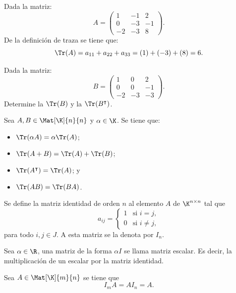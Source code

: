 \documentclass[compacto,10pt]{pubciencias-notas}
\begin{document}
\begin{ejem}
Dada la matriz:
\[
A= 
\begin{pmatrix}
1&-1&2\\
0&-3&-1\\
-2&-3&8
\end{pmatrix}.
\]
De la definición de traza se tiene que:
\[
    \Tr(A) = a_{11} + a_{22} + a_{33} = (1)+(-3)+(8)=6.
\]
\end{ejem}

\begin{ejer}
Dada la matriz:
\[
B= 
\begin{pmatrix}
1&0&2\\
0&0&-1\\
-2&-3&-3
\end{pmatrix}.
\]
Determine la $\Tr(B)$ y la $\Tr(B^{\intercal})$.
\end{ejer}

\begin{teo}\label{Teo:PropTraza}
    Sea $A, B \in \Mat[\K]{n}{n}$ y $\alpha \in \K$. Se tiene que:
    \begin{itemize}
        \item $\Tr(\alpha A) = \alpha \Tr(A)$;
        \item $\Tr(A + B) = \Tr(A) + \Tr(B)$;
        \item $\Tr(A^{\intercal}) = \Tr(A)$; y
        \item $\Tr(A B) = \Tr(B A)$.
    \end{itemize}
\end{teo}


\begin{defi}
    Se define la matriz identidad de orden $n$ al elemento $A$ de $\K^{n \times n}$ tal que
    \[
        a_{ij} =
            \begin{cases}
            1 & \text{si } i=j, \\
            0 & \text{si } i \neq j,
            \end{cases}
    \]
    para todo $i,j\in J$. A esta matriz se la denota por $I_n$.
\end{defi}

\begin{obs}
    Sea $\alpha\in\R$, una matriz de la forma $\alpha I$ se llama matriz escalar. Es decir, la multiplicación de un escalar por la matriz identidad. 
\end{obs}

\begin{prop}
    Sea $A\in\Mat[\K]{m}{n}$ se tiene que
    \[ 
        I_m A = A I_n = A.
    \]
\end{prop}
\end{document}
